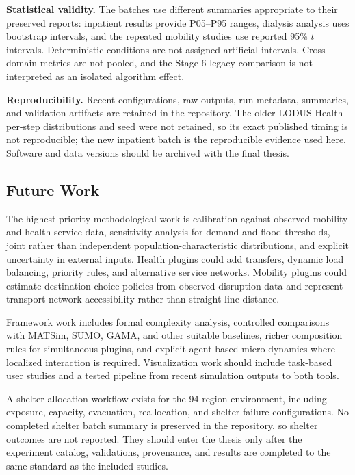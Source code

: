 \documentclass[pdflatex,sn-mathphys-num]{sn-jnl}%
\theoremstyle{thmstyleone}%
\theoremstyle{thmstyletwo}%
\theoremstyle{thmstylethree}%
\begin{document}
\textbf{Statistical validity.} The batches use different summaries appropriate to their preserved reports: inpatient results provide P05--P95 ranges, dialysis analysis uses bootstrap intervals, and the repeated mobility studies use reported 95\% $t$ intervals. Deterministic conditions are not assigned artificial intervals. Cross-domain metrics are not pooled, and the Stage 6 legacy comparison is not interpreted as an isolated algorithm effect.

\textbf{Reproducibility.} Recent configurations, raw outputs, run metadata, summaries, and validation artifacts are retained in the repository. The older LODUS-Health per-step distributions and seed were not retained, so its exact published timing is not reproducible; the new inpatient batch is the reproducible evidence used here. Software and data versions should be archived with the final thesis.

\subsection{Future Work}

The highest-priority methodological work is calibration against observed mobility and health-service data, sensitivity analysis for demand and flood thresholds, joint rather than independent population-characteristic distributions, and explicit uncertainty in external inputs. Health plugins could add transfers, dynamic load balancing, priority rules, and alternative service networks. Mobility plugins could estimate destination-choice policies from observed disruption data and represent transport-network accessibility rather than straight-line distance.

Framework work includes formal complexity analysis, controlled comparisons with MATSim, SUMO, GAMA, and other suitable baselines, richer composition rules for simultaneous plugins, and explicit agent-based micro-dynamics where localized interaction is required. Visualization work should include task-based user studies and a tested pipeline from recent simulation outputs to both tools.

A shelter-allocation workflow exists for the 94-region environment, including exposure, capacity, evacuation, reallocation, and shelter-failure configurations. No completed shelter batch summary is preserved in the repository, so shelter outcomes are not reported. They should enter the thesis only after the experiment catalog, validations, provenance, and results are completed to the same standard as the included studies.
\end{document}
